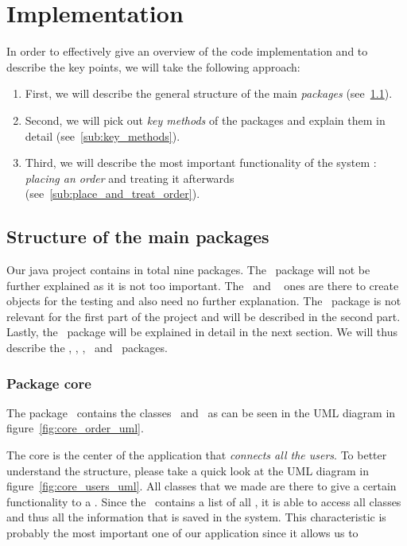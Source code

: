 \section{Implementation} %
\label{sec:implementation}

In order to effectively give an overview of the code implementation
and to describe the key points, we will take the following approach: 

\begin{enumerate}
	\item First, we will describe the general structure of the
  main \emph{packages} (see~\ref{sub:structure_of_the_main_packages}).
	\item Second, we will pick out \emph{key methods} of the packages
  and explain them in detail (see~\ref{sub:key_methods}). 
	\item Third, we will describe the most important functionality of the system :
  \emph{placing an order} and treating it afterwards (see~\ref{sub:place_and_treat_order}).
\end{enumerate}

\subsection{Structure of the main packages} %
\label{sub:structure_of_the_main_packages}
Our java project contains in total nine packages.
The \exceptions~package will not be further explained as it is not too important.
The \parsers~and \txtF~ ones are there to create objects for the testing
and also need no further explanation.
The \userI~package is not relevant for the first part of the project
and will be described in the second part.
Lastly, the \tests~package will be explained in detail in the next section.
We will thus describe the \policies, \restaurantSetup, \policies, \tests~and
\users~packages. 

\subsubsection{Package core} %
\label{ssub:core}
The package \core~contains the classes \Core~and \Order~as can be seen in
the UML diagram in figure~\ref{fig:core_order_uml}. 

The core is the center of the application that \emph{connects all the users}.
To better understand the structure, please take a quick look at the UML diagram
in figure~\ref{fig:core_users_uml}. 
All classes that we made are there to give a certain functionality to a \User.
Since the \Core~contains a list of all \User, it is able to access all classes
and thus all the information that is saved in the system.
This characteristic is probably the most important one of our application since it allows us to

